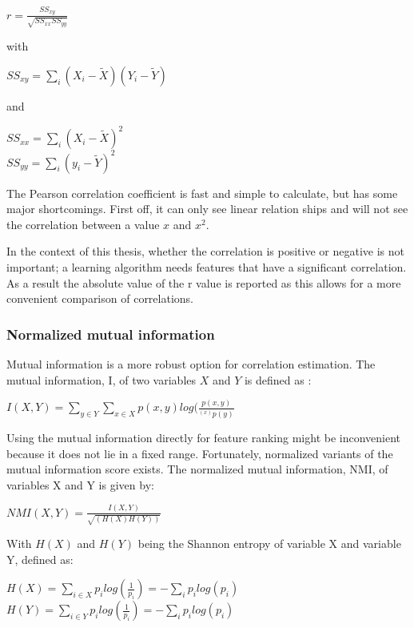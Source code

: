 \begin{center}
$r = \frac{SS_{xy}}{\sqrt{SS_{xx}SS_{yy}}}$
\end{center}
with
\begin{center}
$SS_{xy} = \sum\limits_i (X_i-\tilde{X})(Y_i-\tilde{Y})$
\end{center}
and
\begin{center}
$SS_{xx} = \sum\limits_i (X_i-\tilde{X})^2$ \\
$SS_{yy} = \sum\limits_i (y_i-\tilde{Y})^2$
\end{center}

\npar

The Pearson correlation coefficient is fast and simple to calculate, but has some major shortcomings. First off, it can only see linear relation ships and will not see the correlation between a value $x$ and $x^2$.

\npar

In the context of this thesis, whether the correlation is positive or negative is not important; a learning algorithm needs features that have a significant correlation. As a result the absolute value of the r value is reported as this allows for a more convenient comparison of correlations.

\subsubsection{Normalized mutual information}
Mutual information is a more robust option for correlation estimation. The mutual information, I, of two variables $X$ and $Y$ is defined as \citep{mutPaper}:
\begin{center}
$I(X,Y) = \sum\limits_{y\in Y} \sum\limits_{x\in X} p(x,y)log(\frac{p(x,y)}{^(x)p(y)}$
\end{center}

\npar

Using the mutual information directly for feature ranking might be inconvenient because it does not lie in a fixed range. Fortunately, normalized variants of the mutual information score exists. The normalized mutual information, NMI, of variables X and Y is given by:

\begin{center}
$NMI(X,Y) = \frac{I(X,Y)}{\sqrt{(H(X)H(Y))}}$
\end{center}

With $H(X)$ and $H(Y)$ being the Shannon entropy of variable X and variable Y, defined as:

\begin{center}
$H(X) = \sum\limits_{i\in X} p_ilog(\frac{1}{p_i}) = - \sum\limits_i p_ilog(p_i)$\\
$H(Y) = \sum\limits_{i\in Y} p_ilog(\frac{1}{p_i}) = - \sum\limits_i p_ilog(p_i)$

\end{center}


